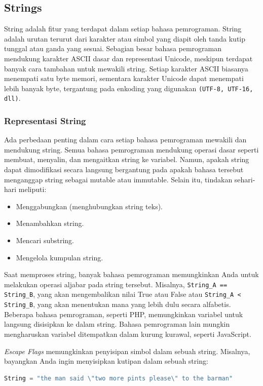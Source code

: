 \documentclass{article}
\begin{document}
\subsection{Strings}
String adalah fitur yang terdapat dalam setiap bahasa pemrograman. String adalah urutan terurut dari karakter atau simbol yang diapit oleh tanda kutip tunggal atau ganda yang sesuai. Sebagian besar bahasa pemrograman mendukung karakter ASCII dasar dan representasi Unicode, meskipun terdapat banyak cara tambahan untuk mewakili string. Setiap karakter ASCII biasanya menempati satu byte memori, sementara karakter Unicode dapat menempati lebih banyak byte, tergantung pada enkoding yang digunakan \verb|(UTF-8, UTF-16, dll)|.

\subsubsection{Representasi String}
Ada perbedaan penting dalam cara setiap bahasa pemrograman mewakili dan mendukung string. Semua bahasa pemrograman mendukung operasi dasar seperti membuat, menyalin, dan mengaitkan string ke variabel. Namun, apakah string dapat dimodifikasi secara langsung bergantung pada apakah bahasa tersebut menganggap string sebagai mutable atau immutable. Selain itu, tindakan sehari-hari meliputi:
\begin{itemize}
    \item Menggabungkan (menghubungkan string teks).
    \item Menambahkan string.
    \item Mencari substring.
    \item Mengelola kumpulan string.
\end{itemize}

Saat memproses string, banyak bahasa pemrograman memungkinkan Anda untuk melakukan operasi aljabar pada string tersebut. Misalnya, \verb|String_A == String_B|, yang akan mengembalikan nilai True atau False atau \verb|String_A < String_B|, yang akan menentukan mana yang lebih dulu secara alfabetis. Beberapa bahasa pemrograman, seperti PHP, memungkinkan variabel untuk langsung disisipkan ke dalam string. Bahasa pemrograman lain mungkin mengharuskan variabel ditempatkan dalam kurung kurawal, seperti JavaScript.

\textit{Escape Flags} memungkinkan penyisipan simbol dalam sebuah string. Misalnya, bayangkan Anda ingin menyisipkan kutipan dalam sebuah string:

\begin{lstlisting}[language=Python, caption={}, captionpos=b]
String = "the man said \"two more pints please\" to the barman"
\end{lstlisting}
\end{document}
